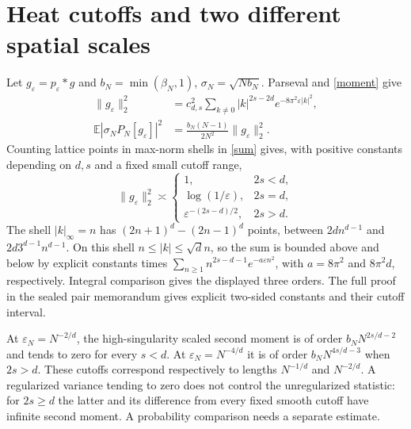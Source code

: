 \documentclass[11pt]{article}
\newcommand{\E}{\mathbb E}
\begin{document}
\section{Heat cutoffs and two different spatial scales}
Let $g_\varepsilon=p_\varepsilon*g$ and
$b_N=\min(\beta_N,1)$, $\sigma_N=\sqrt{Nb_N}$. Parseval and
\eqref{moment} give
\begin{align}
 \|g_\varepsilon\|_2^2
 &=c_{d,s}^2\sum_{k\ne0}|k|^{2s-2d}
                       e^{-8\pi^2\varepsilon|k|^2},\label{sum}\\
 \E|\sigma_NP_N[g_\varepsilon]|^2
 &=\frac{b_N(N-1)}{2N^2}\|g_\varepsilon\|_2^2.\label{scaled}
\end{align}
Counting lattice points in max-norm shells in \eqref{sum} gives, with
positive constants depending on $d,s$ and a fixed small cutoff range,
\[
 \|g_\varepsilon\|_2^2\asymp
 \begin{cases}
  1,&2s<d,\\
  \log(1/\varepsilon),&2s=d,\\
  \varepsilon^{-(2s-d)/2},&2s>d.
 \end{cases}
\]
The shell $|k|_\infty=n$ has $(2n+1)^d-(2n-1)^d$ points, between
$2dn^{d-1}$ and $2d3^{d-1}n^{d-1}$. On this shell
$n\le|k|\le\sqrt d n$, so the sum is bounded above and below by explicit
constants times $\sum_{n\ge1}n^{2s-d-1}e^{-a\varepsilon n^2}$,
with $a=8\pi^2$ and $8\pi^2d$, respectively. Integral comparison gives
the displayed three orders. The full proof in the sealed pair memorandum
gives explicit two-sided constants and their cutoff interval.

At $\varepsilon_N=N^{-2/d}$, the high-singularity scaled second moment is
of order $b_NN^{2s/d-2}$ and tends to zero for every $s<d$. At
$\varepsilon_N=N^{-4/d}$ it is of order $b_NN^{4s/d-3}$ when $2s>d$.
These cutoffs correspond respectively to lengths $N^{-1/d}$ and
$N^{-2/d}$. A regularized variance tending to zero does not control the
unregularized statistic: for $2s\ge d$ the latter and its difference from
every fixed smooth cutoff have infinite second moment. A probability
comparison needs a separate estimate.
\end{document}
